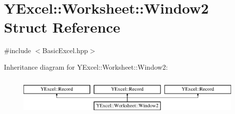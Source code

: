 \hypertarget{struct_y_excel_1_1_worksheet_1_1_window2}{}\section{Y\+Excel\+:\+:Worksheet\+:\+:Window2 Struct Reference}
\label{struct_y_excel_1_1_worksheet_1_1_window2}


{\ttfamily \#include $<$Basic\+Excel.\+hpp$>$}

Inheritance diagram for Y\+Excel\+:\+:Worksheet\+:\+:Window2\+:\begin{figure}[H]
\begin{center}
\leavevmode
\includegraphics[height=2.000000cm]{struct_y_excel_1_1_worksheet_1_1_window2}
\end{center}
\end{figure}
